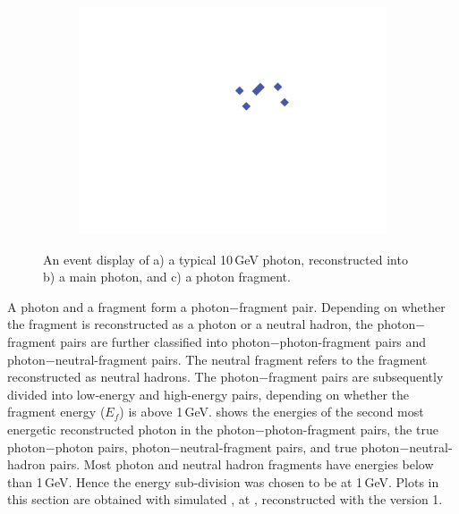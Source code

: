 \begin{figure}[tbph]
\begin{subfigure}[b]{0.3\textwidth}
    \includegraphics[width=\textwidth]{photon/small2}
    \caption{}
    \label{fig:photonEvtDspPhotonFragSmall}
  \end{subfigure}
\caption
{An event display of a) a typical 10\,GeV photon, reconstructed into  b) a main photon,  and c) a photon fragment. }
\label{fig:photonEvtDspPhotonFrag}
\end{figure}




A photon and a fragment form a photon$-$fragment pair.  Depending on whether the fragment is reconstructed as a photon or a neutral hadron, the photon$-$fragment pairs are further classified into photon$-$photon-fragment pairs and photon$-$neutral-fragment pairs. The neutral fragment refers to the fragment reconstructed as neutral hadrons. The photon$-$fragment pairs are subsequently  divided into low-energy and high-energy pairs, depending on whether the fragment energy ($E_f$) is above 1\,GeV.  shows the energies of the second most energetic reconstructed photon in the photon$-$photon-fragment pairs, the true photon$-$photon pairs, photon$-$neutral-fragment pairs, and true photon$-$neutral-hadron pairs. Most photon and neutral hadron fragments have energies below than 1\,GeV. Hence the energy sub-division was chosen to be at 1\,GeV. Plots in this section are obtained with simulated \eeZuds, at , reconstructed with the \pandora version 1.

